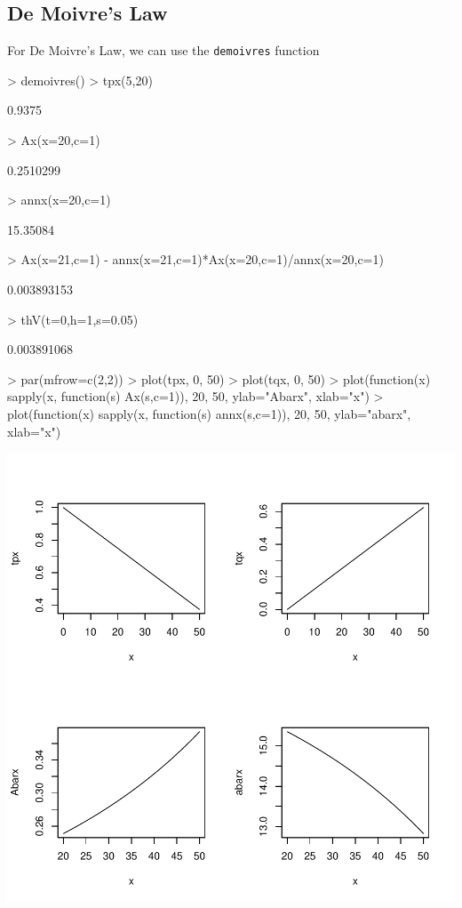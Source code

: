 \documentclass[landscape]{article}
\begin{document}
\subsection{De Moivre's Law}
For De Moivre's Law, we can use the \texttt{demoivres} function
\begin{Schunk}
\begin{Sinput}
> demoivres()
> tpx(5,20)
\end{Sinput}
\begin{Soutput}
[1] 0.9375
\end{Soutput}
\begin{Sinput}
> Ax(x=20,c=1)
\end{Sinput}
\begin{Soutput}
[1] 0.2510299
\end{Soutput}
\begin{Sinput}
> annx(x=20,c=1)
\end{Sinput}
\begin{Soutput}
[1] 15.35084
\end{Soutput}
\begin{Sinput}
> Ax(x=21,c=1) - annx(x=21,c=1)*Ax(x=20,c=1)/annx(x=20,c=1)
\end{Sinput}
\begin{Soutput}
[1] 0.003893153
\end{Soutput}
\begin{Sinput}
> thV(t=0,h=1,s=0.05)
\end{Sinput}
\begin{Soutput}
[1] 0.003891068
\end{Soutput}
\begin{Sinput}
> par(mfrow=c(2,2))
> plot(tpx, 0, 50)
> plot(tqx, 0, 50)
> plot(function(x) sapply(x, function(s) Ax(s,c=1)), 20, 50, ylab="Abarx", xlab="x")
> plot(function(x) sapply(x, function(s) annx(s,c=1)), 20, 50, ylab="abarx", xlab="x")
\end{Sinput}
\end{Schunk}
\includegraphics{survivalModels-002}
\end{document}
